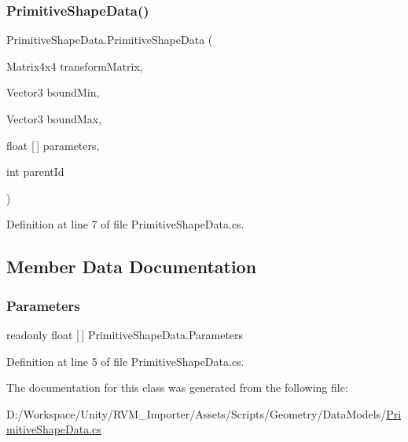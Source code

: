 \subsubsection{\texorpdfstring{PrimitiveShapeData()}{PrimitiveShapeData()}}
{\footnotesize\ttfamily Primitive\+Shape\+Data.\+Primitive\+Shape\+Data (\begin{DoxyParamCaption}\item[{Matrix4x4}]{transform\+Matrix,  }\item[{Vector3}]{bound\+Min,  }\item[{Vector3}]{bound\+Max,  }\item[{float \mbox{[}$\,$\mbox{]}}]{parameters,  }\item[{int}]{parent\+Id }\end{DoxyParamCaption})}



Definition at line 7 of file Primitive\+Shape\+Data.\+cs.



\subsection{Member Data Documentation}
\mbox{\label{class_primitive_shape_data_a707cc26c1812c832d26605d848e5c3e4}} 
\subsubsection{\texorpdfstring{Parameters}{Parameters}}
{\footnotesize\ttfamily readonly float \mbox{[}$\,$\mbox{]} Primitive\+Shape\+Data.\+Parameters}



Definition at line 5 of file Primitive\+Shape\+Data.\+cs.



The documentation for this class was generated from the following file\+:\begin{DoxyCompactItemize}
\item 
D\+:/\+Workspace/\+Unity/\+R\+V\+M\+\_\+\+Importer/\+Assets/\+Scripts/\+Geometry/\+Data\+Models/\mbox{\hyperlink{_primitive_shape_data_8cs}{Primitive\+Shape\+Data.\+cs}}\end{DoxyCompactItemize}
